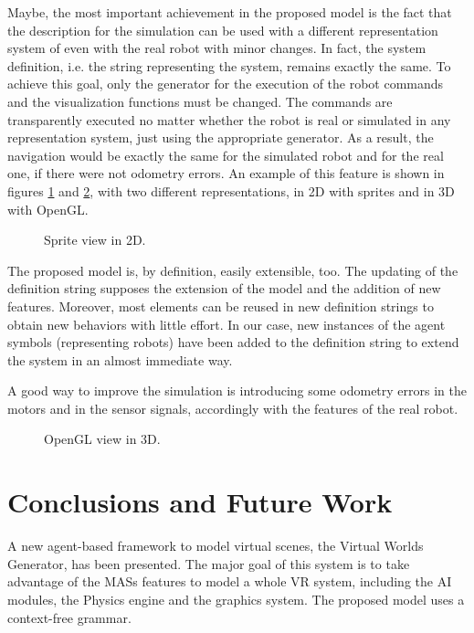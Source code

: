 \documentclass{aamas2012}
\begin{document}
Maybe, the most important achievement in the proposed model is the fact that the description for the simulation can be used with a different representation system of even with the real robot with minor changes. In fact, the system definition, i.e. the string representing the system, remains exactly the same. To achieve this goal, only the generator for the execution of the robot commands and the visualization functions must be changed. The commands are transparently executed no matter whether the robot is real or simulated in any representation system, just using the appropriate generator. As a result, the navigation would be exactly the same for the simulated robot and for the real one, if there were not odometry errors. An example of this feature is shown in figures \ref{fig:map2D} and \ref{fig:map3D}, with two different representations, in 2D with sprites and in 3D with OpenGL.

\begin{figure}
\centering
{}
\caption{\label{fig:map2D} Sprite view in 2D.}
\end{figure}

The proposed model is, by definition, easily extensible, too. The updating of the definition string supposes the extension of the model and the addition of new features. Moreover, most elements can be reused in new definition strings to obtain new behaviors with little effort. In our case, new instances of the agent symbols (representing robots) have been added to the definition string to extend the system in an almost immediate way. 

 A good way to improve the simulation is introducing some odometry errors in the motors and in the sensor signals, accordingly with the features of the real robot.

\begin{figure}
\centering
{}
\caption{\label{fig:map3D} OpenGL view in 3D.}
\end{figure}


\section{Conclusions and Future Work
\label{sec:conclusions}}


A new agent-based framework to model virtual scenes, the Virtual Worlds Generator, has been presented. The major goal of this system is to take advantage of the MASs features to model a whole VR system, including the AI modules, the Physics engine and the graphics system. The proposed model uses a context-free grammar.
\end{document}

